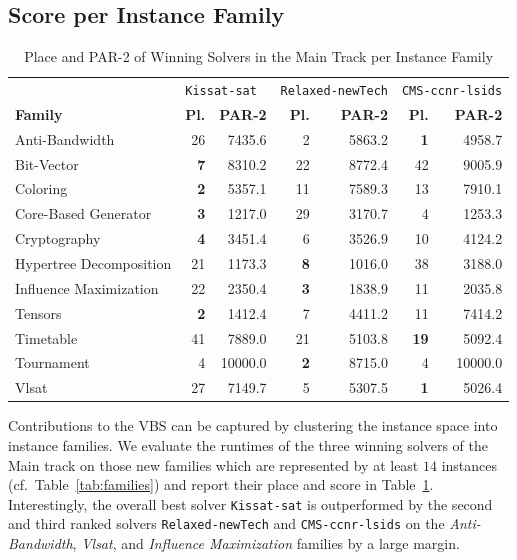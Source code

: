\documentclass{elsarticle}
\newcommand{\solver}[1]{\texttt{#1}}
\begin{document}
\subsection{Score per Instance Family} 

\begin{table}[b]
\small
\begin{tabularx}{\linewidth}{X|rrrrrr}
 & \multicolumn{2}{l}{\solver{Kissat-sat}} & \multicolumn{2}{l}{\solver{Relaxed-newTech}} & \multicolumn{2}{l}{\solver{CMS-ccnr-lsids}} \\
\bf Family & \bf Pl. & \bf PAR-2 & \bf Pl. & \bf PAR-2 & \bf Pl. & \bf PAR-2 \\
\hline
Anti-Bandwidth 			& 26 & 7435.6 &  2 & 5863.2 &  \bf 1 & 4958.7\\
Bit-Vector 				&  \bf 7 & 8310.2 & 22 & 8772.4 & 42 & 9005.9\\
Coloring 				&  \bf 2 & 5357.1 & 11 & 7589.3 & 13 & 7910.1\\
Core-Based Generator 	&  \bf 3 & 1217.0 & 29 & 3170.7 &  4 & 1253.3\\
Cryptography 			&  \bf 4 & 3451.4 &  6 & 3526.9 & 10 & 4124.2\\
Hypertree Decomposition & 21 & 1173.3 &  \bf 8 & 1016.0 & 38 & 3188.0\\
Influence Maximization 	& 22 & 2350.4 &  \bf 3 & 1838.9 & 11 & 2035.8\\
Tensors 				&  \bf 2 & 1412.4 &  7 & 4411.2 & 11 & 7414.2\\
Timetable 				& 41 & 7889.0 & 21 & 5103.8 & \bf 19 & 5092.4\\
Tournament 				& 4 & 10000.0&  \bf 2 & 8715.0 &  4 & 10000.0\\
Vlsat 					& 27 & 7149.7 &  5 & 5307.5 &  \bf 1 & 5026.4\\
\end{tabularx}
\caption{Place and PAR-2 of Winning Solvers in the Main Track per Instance Family}
\label{tab:eval-by-family}
\end{table}

Contributions to the VBS can be captured by clustering the instance space into instance families.
We evaluate the runtimes of the three winning solvers of the Main track on those new families which are represented by at least $14$ instances (cf.~Table~\ref{tab:families})
and report their place and score in Table~\ref{tab:eval-by-family}. 
Interestingly, the overall best solver \solver{Kissat-sat} is outperformed by the second and third ranked solvers \solver{Relaxed-newTech} and \solver{CMS-ccnr-lsids} on the \emph{Anti-Bandwidth}, \emph{Vlsat}, and \emph{Influence Maximization} families by a large margin. 
\end{document}
